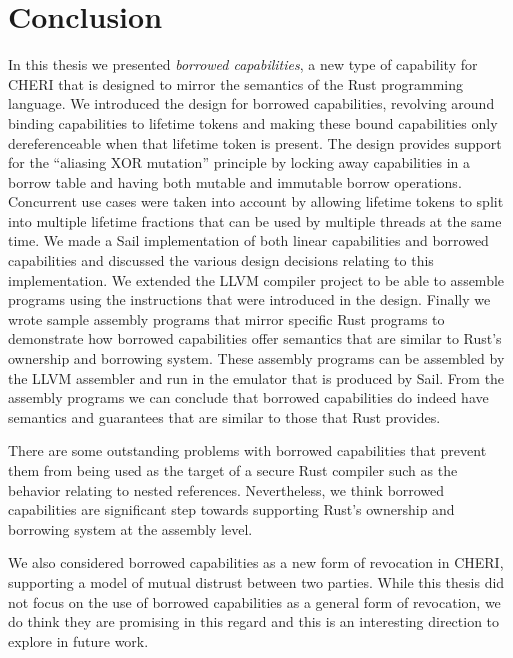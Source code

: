 \chapter{Conclusion}
\label{cha:conclusion}
In this thesis we presented \textit{borrowed capabilities}, a new type of capability for CHERI that is designed to mirror the semantics of the Rust programming language.
We introduced the design for borrowed capabilities, revolving around binding capabilities to lifetime tokens and making these bound capabilities only dereferenceable when that lifetime token is present.
The design provides support for the ``aliasing XOR mutation'' principle by locking away capabilities in a borrow table and having both mutable and immutable borrow operations.
Concurrent use cases were taken into account by allowing lifetime tokens to split into multiple lifetime fractions that can be used by multiple threads at the same time.
We made a Sail implementation of both linear capabilities and borrowed capabilities and discussed the various design decisions relating to this implementation.
We extended the LLVM compiler project to be able to assemble programs using the instructions that were introduced in the design.
Finally we wrote sample assembly programs that mirror specific Rust programs to demonstrate how borrowed capabilities offer semantics that are similar to Rust's ownership and borrowing system.
These assembly programs can be assembled by the LLVM assembler and run in the emulator that is produced by Sail.
From the assembly programs we can conclude that borrowed capabilities do indeed have semantics and guarantees that are similar to those that Rust provides.

There are some outstanding problems with borrowed capabilities that prevent them from being used as the target of a secure Rust compiler such as the behavior relating to nested references.
Nevertheless, we think borrowed capabilities are significant step towards supporting Rust's ownership and borrowing system at the assembly level.

We also considered borrowed capabilities as a new form of revocation in CHERI, supporting a model of mutual distrust between two parties.
While this thesis did not focus on the use of borrowed capabilities as a general form of revocation, we do think they are promising in this regard and this is an interesting direction to explore in future work.



